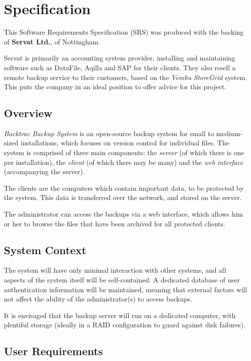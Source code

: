 \chapter{Specification}

This Software Requirements Specification (SRS) was produced with the backing of
\textbf{Servat Ltd.}, of Nottingham.

Servat is primarily an accounting system provider, installing and maintaining
software such as DataFile, Aqilla and SAP for their clients. They also resell
a remote backup service to their customers, based on the \emph{Vembu StoreGrid}
system. This puts the company in an ideal position to offer advice for this
project.

\section{Overview}

\emph{Backtrac Backup System} is an open-source backup system for small to
medium-sized installations, which focuses on version control for individual
files. The system is comprised of three main components: the \emph{server} (of
which there is one per installation), the \emph{client} (of which there may be
many) and the \emph{web interface} (accompanying the server).

The clients are the computers which contain important data, to be protected by
the system. This data is transferred over the network, and stored on the
server.

The administrator can access the backups via a web interface, which allows
him or her to browse the files that have been archived for all protected
clients.

\section{System Context}

The system will have only minimal interaction with other systems, and all
aspects of the system itself will be self-contained. A dedicated database of
user authentication information will be maintained, meaning that external
factors will not affect the ability of the administrator(s) to access backups.

It is envisaged that the backup server will run on a dedicated computer, with
plentiful storage (ideally in a RAID configuration to guard against disk
failures).

\section{User Requirements}

